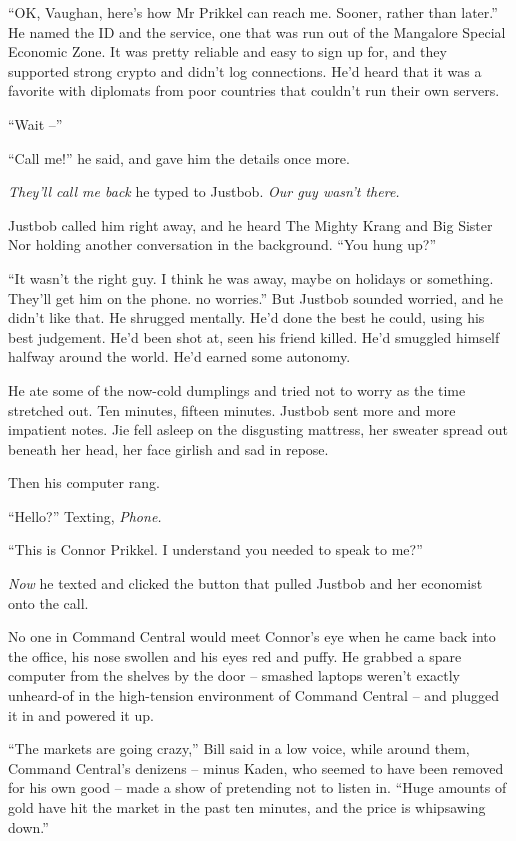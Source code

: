 ``OK, Vaughan, here's how Mr Prikkel can reach me. Sooner, rather
than later.'' He named the ID and the service, one that was run out
of the Mangalore Special Economic Zone. It was pretty reliable and
easy to sign up for, and they supported strong crypto and didn't
log connections. He'd heard that it was a favorite with diplomats
from poor countries that couldn't run their own servers.

``Wait --''

``Call me!'' he said, and gave him the details once more.

\emph{They'll call me back} he typed to Justbob.
\emph{Our guy wasn't there.}

Justbob called him right away, and he heard The Mighty Krang and
Big Sister Nor holding another conversation in the background. ``You
hung up?''

``It wasn't the right guy. I think he was away, maybe on holidays or
something. They'll get him on the phone. no worries.'' But Justbob
sounded worried, and he didn't like that. He shrugged mentally.
He'd done the best he could, using his best judgement. He'd been
shot at, seen his friend killed. He'd smuggled himself halfway
around the world. He'd earned some autonomy.

He ate some of the now-cold dumplings and tried not to worry as the
time stretched out. Ten minutes, fifteen minutes. Justbob sent more
and more impatient notes. Jie fell asleep on the disgusting
mattress, her sweater spread out beneath her head, her face girlish
and sad in repose.

Then his computer rang.

``Hello?'' Texting, \emph{Phone.}

``This is Connor Prikkel. I understand you needed to speak to me?''

\emph{Now} he texted and clicked the button that pulled Justbob and
her economist onto the call.

\tb

No one in Command Central would meet Connor's eye when he came back
into the office, his nose swollen and his eyes red and puffy. He
grabbed a spare computer from the shelves by the door -- smashed
laptops weren't exactly unheard-of in the high-tension environment
of Command Central -- and plugged it in and powered it up.

``The markets are going crazy,'' Bill said in a low voice, while
around them, Command Central's denizens -- minus Kaden, who seemed
to have been removed for his own good -- made a show of pretending
not to listen in. ``Huge amounts of gold have hit the market in the
past ten minutes, and the price is whipsawing down.''

